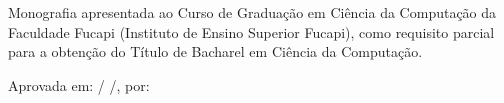\documentclass[
	12pt,				%
	openright,			%
	oneside,	
	a4paper,				%
	english,				%
	brazil				%
]{abntex2/abntex2} %
\begin{document}
\begin{folhadeaprovacao}
	\parindent=0pt
	\setlength{\ABNTEXsignskip}{1.5cm}
	
	\begin{center}
		
		{\fontsize{12}{15}\selectfont\imprimirautor}
		\vspace*{\fill}
		\begin{center}
			\fontsize{12}{15}\selectfont\imprimirtitulo
		\end{center}
		\vspace*{\fill}
	\end{center}	
	\begin{SingleSpace}
	Monografia apresentada ao Curso de Graduação em Ciência da Computação da Faculdade Fucapi (Instituto de Ensino Superior Fucapi), como requisito parcial para a obtenção do Título de Bacharel em Ciência da Computação.
	\end{SingleSpace}
	Aprovada em: \hspace*{0.8cm}/ \hspace*{0.8cm}/\hspace*{1.2cm}, por:

	\vspace{1cm}

	\vspace{1cm}
	\vfill
    
	\begin{center}
		\fontsize{12}{15}\selectfont
		\vspace*{0.5cm}
		\imprimirlocal
		\\
		\imprimirdata
		\vspace*{1cm}
	\end{center}
  
 \end{folhadeaprovacao}
\end{document}
